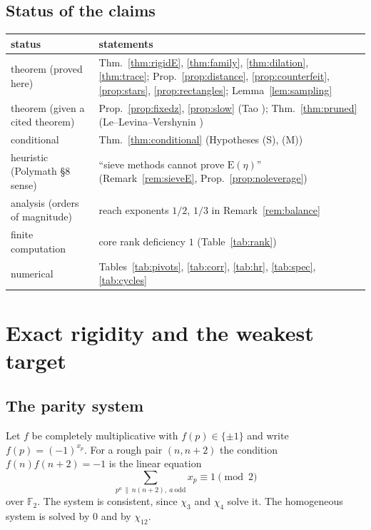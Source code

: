 \documentclass[11pt]{amsart}
\theoremstyle{definition}
\theoremstyle{remark}
\newcommand{\EE}{\mathrm E}
\begin{document}
\subsection{Status of the claims}
\begin{table}[h]
\centering\small
\begin{tabular}{ll}
\toprule
status & statements\\
\midrule
theorem (proved here) & Thm.~\ref{thm:rigidE}, \ref{thm:family}, \ref{thm:dilation}, \ref{thm:trace}; Prop.~\ref{prop:distance}, \ref{prop:counterfeit}, \ref{prop:stars}, \ref{prop:rectangles}; Lemma~\ref{lem:sampling}\\
theorem (given a cited theorem) & Prop.~\ref{prop:fixedz}, \ref{prop:slow} (Tao \cite{Tao16}); Thm.~\ref{thm:pruned} (Le--Levina--Vershynin \cite{LLV17})\\
conditional & Thm.~\ref{thm:conditional} (Hypotheses (S), (M))\\
heuristic (Polymath \S8 sense) & ``sieve methods cannot prove $\EE(\eta)$'' (Remark~\ref{rem:sieveE}, Prop.~\ref{prop:noleverage})\\
analysis (orders of magnitude) & reach exponents $1/2$, $1/3$ in Remark~\ref{rem:balance}\\
finite computation & core rank deficiency $1$ (Table~\ref{tab:rank})\\
numerical & Tables~\ref{tab:pivots}, \ref{tab:corr}, \ref{tab:hr}, \ref{tab:spec}, \ref{tab:cycles}\\
\bottomrule
\end{tabular}
\end{table}

\section{Exact rigidity and the weakest target}\label{sec:rigidity}

\subsection{The parity system}
Let $f$ be completely multiplicative with $f(p)\in\{\pm1\}$ and write $f(p)=(-1)^{x_p}$. For a rough pair $(n,n+2)$ the condition $f(n)f(n+2)=-1$ is the linear equation
\[
\sum_{p^a\,\|\,n(n+2),\ a\ \mathrm{odd}}x_p\equiv1\pmod2
\]
over $\mathbb F_2$. The system is consistent, since $\chi_3$ and $\chi_4$ solve it. The homogeneous system is solved by $0$ and by $\chi_{12}$.
\end{document}
